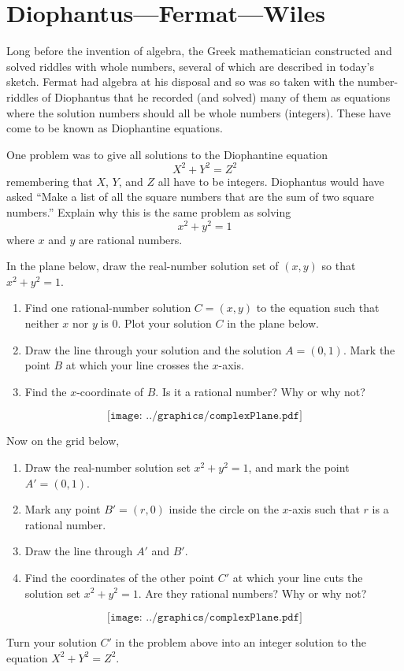 \newpage
\section{Diophantus---Fermat---Wiles}

Long before the invention of algebra, the Greek mathematician
constructed and solved riddles with whole numbers, several of which
are described in today's sketch.  Fermat had algebra at his disposal
and so was so taken with the number-riddles of Diophantus that he
recorded (and solved) many of them as equations where the solution
numbers should all be whole numbers (integers).  These have come to be
known as Diophantine equations.

\begin{prob}
One problem was to give all solutions to the Diophantine equation
\[
X^2 + Y^2 = Z^2
\]
remembering that $X$, $Y$, and $Z$ all have to be integers.
Diophantus would have asked ``Make a list of all the square numbers
that are the sum of two square numbers.''  Explain why this is the
same problem as solving 
\[
x^2 + y^2 = 1
\]
where $x$ and $y$ are rational numbers.
\end{prob}


\begin{prob}
In the plane below, draw the real-number solution set of $(x,y)$ so
that $x^2 + y^2 = 1$.
\begin{enumerate}
\item Find one rational-number solution $C = (x,y)$ to the equation such that neither $x$ nor $y$ is $0$.  Plot your solution $C$ in the plane below.
\item Draw the line through your solution and the solution $A = (0,1)$.  Mark the point $B$ at which your line crosses the $x$-axis.
\item Find the $x$-coordinate of $B$.  Is it a rational number?  Why or why not?
\end{enumerate}
\[
\texttt{[image: ../graphics/complexPlane.pdf]}
\]
\end{prob}

\begin{prob}
Now on the grid below,
\begin{enumerate}
\item Draw the real-number solution set $x^2+y^2 = 1$, and mark the point $A' = (0,1)$.
\item Mark any point $B' = (r,0)$ inside the circle on the $x$-axis such that $r$ is a rational number.
\item Draw the line through $A'$ and $B'$.
\item Find the coordinates of the other point $C'$ at which your line cuts the solution set $x^2+y^2 =1$.  Are they rational numbers?  Why or why not?
\end{enumerate}
\[
\texttt{[image: ../graphics/complexPlane.pdf]}
\]
\end{prob}

\begin{prob}
Turn your solution $C'$ in the problem above into an integer solution
to the equation $X^2 + Y^2 = Z^2$.
\end{prob}

